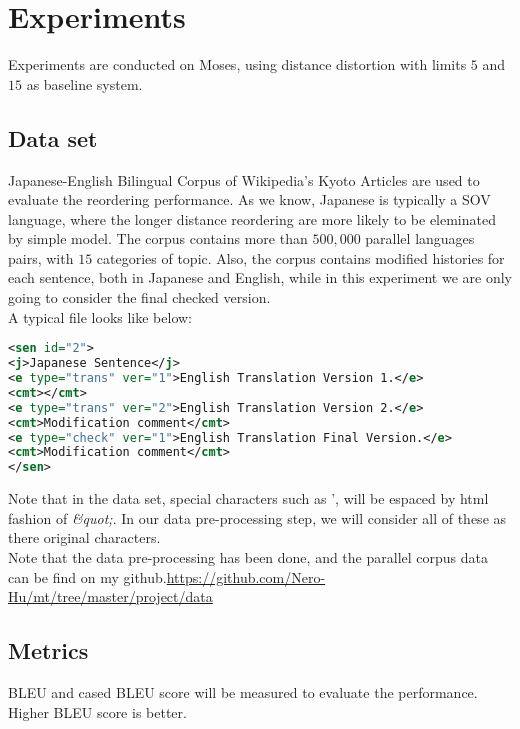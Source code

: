 \documentclass[11pt,letterpaper]{article}
\begin{document}
\section{Experiments} %
\label{sec:experiments}
Experiments are conducted on Moses, using distance distortion with limits $5$ and $15$ as baseline system.
\subsection{Data set} %
\label{sub:data_set}
Japanese-English Bilingual Corpus of Wikipedia's Kyoto Articles\cite{nict:2012} are used to evaluate the reordering performance. As we know, Japanese is typically a SOV language, where the longer distance reordering are more likely to be eleminated by simple model. The corpus contains more than $500,000$ parallel languages pairs, with $15$ categories of topic. Also, the corpus contains modified histories for each sentence, both in Japanese and English, while in this experiment we are only going to consider the final checked version. \\
A typical file looks like below:
\begin{lstlisting}[language=xml, caption={Corpus data structure}]
<sen id="2">
<j>Japanese Sentence</j>
<e type="trans" ver="1">English Translation Version 1.</e>
<cmt></cmt>
<e type="trans" ver="2">English Translation Version 2.</e>
<cmt>Modification comment</cmt>
<e type="check" ver="1">English Translation Final Version.</e>
<cmt>Modification comment</cmt>
</sen>
\end{lstlisting}
Note that in the data set, special characters such as ', will be espaced by html fashion of \textit{\&quot;}. In our data pre-processing step, we will consider all of these as there original characters.\\
Note that the data pre-processing has been done, and the parallel corpus data can be find on my github.\url{https://github.com/Nero-Hu/mt/tree/master/project/data}

\subsection{Metrics} %
\label{sub:metrics}
BLEU and cased BLEU score will be measured to evaluate the performance. Higher BLEU score is better.
\end{document}
